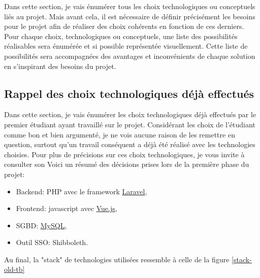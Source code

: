 \documentclass[
    iai, %
    il, %
]{heig-tb}
\begin{document}
Dans cette section, je vais énumérer tous les choix technologiques ou conceptuels liés au projet.
Mais avant cela, il est nécessaire de définir précisément les besoins pour le projet afin de réaliser des choix cohérents en fonction de ces derniers.\newline
Pour chaque choix, technologiques ou conceptuels, une liste des possibilités réalisables sera énumérée et si possible représentée visuellement.\newline
Cette liste de possibilités sera accompagnées des avantages et inconvénients de chaque solution en s'inspirant des besoins du projet.

\subsection{Rappel des choix technologiques déjà effectués}
Dans cette section, je vais énumérer les choix technologiques déjà effectués par le premier étudiant ayant travaillé sur le projet.\newline
Considérant les choix de l'étudiant comme bon et bien argumenté, je ne vois aucune raison de les remettre en question, surtout qu'un travail conséquent a déjà été réalisé avec les technologies choisies. Pour plus de précisions sur ces choix technologiques, je vous invite à consulter son %
Voici un résumé des décisions prises lors de la première phase du projet:
\begin{itemize}
    \item Backend: PHP avec le framework \href{https://laravel.com/}{Laravel},
    \item Frontend: \Gls{javascript} avec \href{https://vuejs.org/}{Vue.js},
    \item SGBD: \href{https://www.mysql.com/}{MySQL},
    \item Outil SSO: Shibboleth. %
\end{itemize}

Au final, la "stack" de technologies utilisées ressemble à celle de la figure \ref{stack-old-tb}
\end{document}
